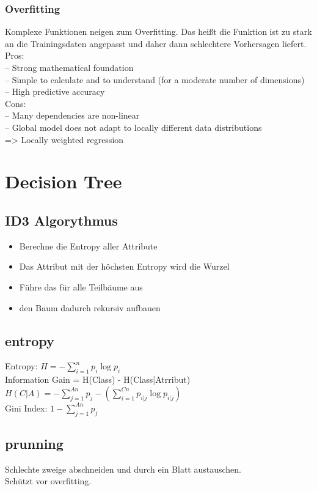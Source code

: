 \documentclass[a4paper]{scrartcl}
\begin{document}
\subsubsection{Overfitting}
Komplexe Funktionen neigen zum Overfitting. Das heißt die Funktion ist zu stark an die Trainingsdaten angepasst und daher dann schlechtere Vorhersagen liefert.\\

Pros:\\
– Strong mathematical foundation\\
– Simple to calculate and to understand (for a moderate number of
dimensions)\\
– High predictive accuracy\\

Cons:\\
– Many dependencies are non-linear\\
– Global model does not adapt to locally different data distributions\\
 => Locally weighted regression\\
 
 \section{Decision Tree}
 \subsection{ID3 Algorythmus}
 \begin{itemize}
 \item Berechne die Entropy aller Attribute
 \item Das Attribut mit der  höchsten Entropy wird die Wurzel
 \item Führe das für alle Teilbäume aus
 \item den Baum dadurch rekursiv aufbauen
 \end{itemize}
 \subsection{entropy}
 Entropy: $H = -\sum\limits^n _{i=1} p_i \log p_i $\\
 Information Gain = H(Class) - H(Class|Atrribut)\\
 $H(C|A) = -\sum\limits^{An} _{j=1} p_j-(\sum\limits^{Cn} _{i=1} p_{i|j} \log p_{i|j})$\\
 Gini Index: $1-\sum\limits^{An} _{j=1} p_j$\\
 
 \subsection{prunning}
 Schlechte zweige abschneiden und durch ein Blatt austauschen.\\
 Schützt vor overfitting.
 
\end{document}
